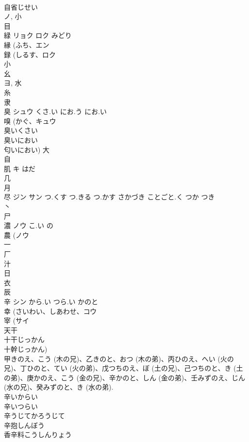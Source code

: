 \documentclass[8pt]{extreport}
\begin{document}
\begin{CJK}{UTF8}{min}
\\	自省じせい
\\	ノ, 小 
\\	目 
\\	緑	リョク ロク	みどり	
\\	縁 (ふち、エン 
\\	録 (しるす、ロク 
\\	小 
\\	幺 
\\	ヨ, 水 
\\	糸 
\\	隶 
\\	臭	シュウ	くさ.い にお.う にお.い	
\\	嗅 (かぐ、キュウ 
\\	臭いくさい 
\\	臭いにおい 
\\	匂いにおい)	大 
\\	自 
\\	肌	キ	はだ	
\\	几 
\\	月 
\\	尽	ジン サン	つ.くす つ.きる つ.かす さかづき ことごと.く つか つき	
\\	丶 
\\	尸 
\\	濃	ノウ	こ.い の	
\\	農 (ノウ 
\\	一 
\\	厂 
\\	汁 
\\	日 
\\	衣 
\\	辰 
\\	辛	シン	から.い つら.い かのと	
\\	幸 (さいわい、しあわせ、コウ 
\\	宰 (サイ 
\\	天干 
\\	十干じっかん 
\\	十幹じっかん) 
\\	甲きのえ、こう (木の兄)、乙きのと、おつ (木の弟)、丙ひのえ、へい (火の兄)、丁ひのと、てい (火の弟)、戊つちのえ、ぼ (土の兄)、己つちのと、き (土の弟)、庚かのえ、こう (金の兄)、辛かのと、しん (金の弟)、壬みずのえ、じん (水の兄)、癸みずのと、き (水の弟). 
\\	辛いからい
\\	辛いつらい
\\	辛うじてかろうじて
\\	辛抱しんぼう
\\	香辛料こうしんりょう

\end{CJK}
\end{document}
